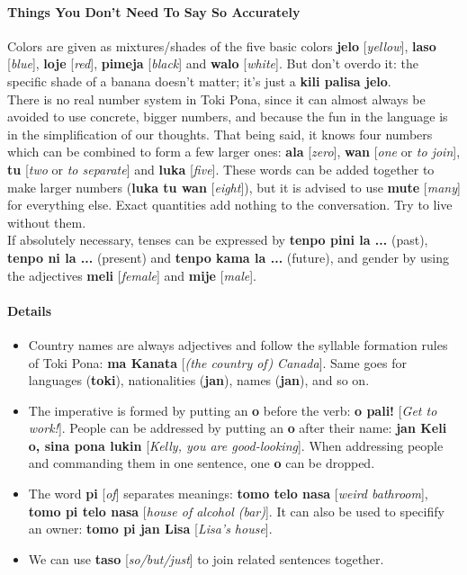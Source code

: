 \documentclass[10pt,a4paper]{article}
\begin{document}
\paragraph{Things You Don't Need To Say So Accurately}
Colors are given as mixtures/shades of the five basic colors \textbf{jelo} [\textit{yellow}], \textbf{laso} [\textit{blue}], \textbf{loje} [\textit{red}], \textbf{pimeja} [\textit{black}] and \textbf{walo} [\textit{white}]. But don't overdo it: the specific shade of a banana doesn't matter; it's just a \textbf{kili palisa jelo}.\\
\noindent There is no real number system in Toki Pona, since it can almost always be avoided to use concrete, bigger numbers, and because the fun in the language is in the simplification of our thoughts. That being said, it knows four numbers which can be combined to form a few larger ones: \textbf{ala} [\textit{zero}], \textbf{wan} [\textit{one} or \textit{to join}], \textbf{tu} [\textit{two} or \textit{to separate}] and \textbf{luka} [\textit{five}]. These words can be added together to make larger numbers (\textbf{luka tu wan} [\textit{eight}]), but it is advised to use \textbf{mute} [\textit{many}] for everything else. Exact quantities add nothing to the conversation. Try to live without them.\\
If absolutely necessary, tenses can be expressed by \textbf{tenpo pini la ...} (past), \textbf{tenpo ni la ...} (present) and \textbf{tenpo kama la ...} (future), and gender by using the adjectives \textbf{meli} [\textit{female}] and \textbf{mije} [\textit{male}].

\newpage
\paragraph{Details}
\begin{multicols}{2}
\begin{itemize}
\item Country names are always adjectives and follow the syllable formation rules of Toki Pona: \textbf{ma Kanata} [\textit{(the country of) Canada}]. Same goes for languages (\textbf{toki}), nationalities (\textbf{jan}), names (\textbf{jan}), and so on.
\item The imperative is formed by putting an \textbf{o} before the verb: \textbf{o pali!} [\textit{Get to work!}]. People can be addressed by putting an \textbf{o} after their name: \textbf{jan Keli o, sina pona lukin} [\textit{Kelly, you are good-looking}]. When addressing people and commanding them in one sentence, one \textbf{o} can be dropped.
\item The word \textbf{pi} [\textit{of}] separates meanings: \textbf{tomo telo nasa} [\textit{weird bathroom}], \textbf{tomo pi telo nasa} [\textit{house of alcohol (bar)}]. It can also be used to specifify an owner: \textbf{tomo pi jan Lisa} [\textit{Lisa's house}].
\item We can use \textbf{taso} [\textit{so/but/just}] to join related sentences together.
\end{itemize}
\end{multicols}
\end{document}
